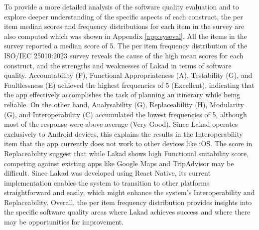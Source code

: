 To provide a more detailed analysis of the software quality evaluation and to explore deeper understanding of the specific aspects of each construct, the per item median scores and frequency distributions for each item in the survey are also computed which was shown in Appendix \ref{app:syseval}. All the items in the survey reported a median score of 5. The per item frequency distribution of the ISO/IEC 25010:2023 survey reveals the cause of the high mean scores for each construct, and the strengths and weaknesses of Lakad in terms of software quality. Accountability (F), Functional Appropriateness (A), Testability (G), and Faultlessness (E) achieved the highest frequencies of 5 (Excellent), indicating that the app effectively accomplishes the task of planning an itinerary while being reliable. On the other hand, Analysability (G), Replaceability (H), Modularity (G), and Interoperability (C) accumulated the lowest frequencies of 5, although most of the response were above average (Very Good). Since Lakad operates exclusively to Android devices, this explains the results in the Interoperability item that the app currently does not work to other devices like iOS. The score in Replaceability suggest that while Lakad shows high Functional suitability score, competing against existing apps like Google Maps and TripAdvisor may be difficult. Since Lakad was developed using React Native, its current implementation enables the system to transition to other platforms straightforward and easily, which might enhance the system’s Interoperability and Replaceability. Overall, the per item frequency distribution provides insights into the specific software quality areas where Lakad achieves success and where there may be opportunities for improvement.

